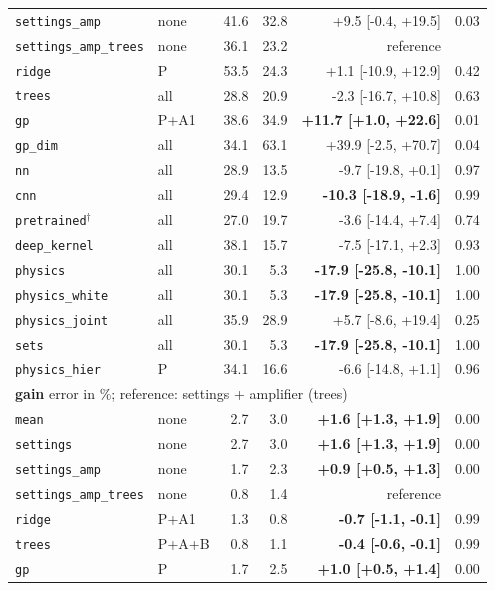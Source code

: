 \begin{tabular}{llrrrl}
\texttt{settings\_amp} & none & 41.6 & 32.8 & +9.5 [-0.4, +19.5] & 0.03 \\
\texttt{settings\_amp\_trees} & none & 36.1 & 23.2 & reference &  \\
\texttt{ridge} & P & 53.5 & 24.3 & +1.1 [-10.9, +12.9] & 0.42 \\
\texttt{trees} & all & 28.8 & 20.9 & -2.3 [-16.7, +10.8] & 0.63 \\
\texttt{gp} & P+A1 & 38.6 & 34.9 & \textbf{+11.7 [+1.0, +22.6]} & 0.01 \\
\texttt{gp\_dim} & all & 34.1 & 63.1 & +39.9 [-2.5, +70.7] & 0.04 \\
\texttt{nn} & all & 28.9 & 13.5 & -9.7 [-19.8, +0.1] & 0.97 \\
\texttt{cnn} & all & 29.4 & 12.9 & \textbf{-10.3 [-18.9, -1.6]} & 0.99 \\
\texttt{pretrained}$^{\dagger}$ & all & 27.0 & 19.7 & -3.6 [-14.4, +7.4] & 0.74 \\
\texttt{deep\_kernel} & all & 38.1 & 15.7 & -7.5 [-17.1, +2.3] & 0.93 \\
\texttt{physics} & all & 30.1 & 5.3 & \textbf{-17.9 [-25.8, -10.1]} & 1.00 \\
\texttt{physics\_white} & all & 30.1 & 5.3 & \textbf{-17.9 [-25.8, -10.1]} & 1.00 \\
\texttt{physics\_joint} & all & 35.9 & 28.9 & +5.7 [-8.6, +19.4] & 0.25 \\
\texttt{sets} & all & 30.1 & 5.3 & \textbf{-17.9 [-25.8, -10.1]} & 1.00 \\
\texttt{physics\_hier} & P & 34.1 & 16.6 & -6.6 [-14.8, +1.1] & 0.96 \\
\midrule
\multicolumn{6}{l}{\textbf{gain} \quad error in \%; reference: settings + amplifier (trees)} \\
\midrule
\texttt{mean} & none & 2.7 & 3.0 & \textbf{+1.6 [+1.3, +1.9]} & 0.00 \\
\texttt{settings} & none & 2.7 & 3.0 & \textbf{+1.6 [+1.3, +1.9]} & 0.00 \\
\texttt{settings\_amp} & none & 1.7 & 2.3 & \textbf{+0.9 [+0.5, +1.3]} & 0.00 \\
\texttt{settings\_amp\_trees} & none & 0.8 & 1.4 & reference &  \\
\texttt{ridge} & P+A1 & 1.3 & 0.8 & \textbf{-0.7 [-1.1, -0.1]} & 0.99 \\
\texttt{trees} & P+A+B & 0.8 & 1.1 & \textbf{-0.4 [-0.6, -0.1]} & 0.99 \\
\texttt{gp} & P & 1.7 & 2.5 & \textbf{+1.0 [+0.5, +1.4]} & 0.00 \\

\end{tabular}
